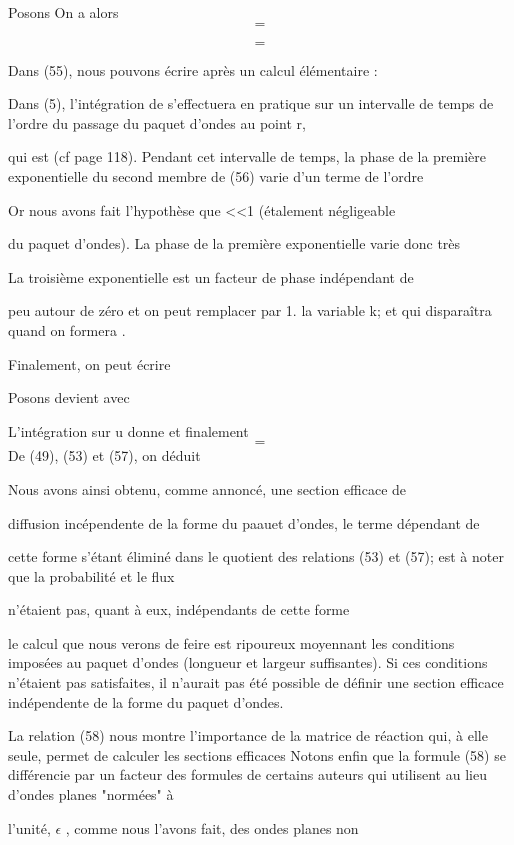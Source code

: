 Posons
On a alors
\[
\tag{55}=
\]

\[
\tag{56}=
\]


Dans (55), nous pouvons écrire après un calcul élémentaire :

Dans (5), l'intégration de  s'effectuera en pratique sur un
intervalle de temps de l'ordre du passage du paquet d'ondes au point r,

qui est (cf page 118).
Pendant cet intervalle de temps, la phase de la première exponentielle du
second membre de (56) varie d'un terme de l'ordre

Or nous avons fait l'hypothèse que <<1 (étalement négligeable

du paquet d'ondes). La phase de la première exponentielle varie donc très

La troisième exponentielle est un facteur de phase indépendant de

peu autour de zéro et on peut remplacer  par 1.
la variable k; et qui disparaîtra quand on formera .

Finalement, on peut écrire

Posons 
 devient  avec


L'intégration sur u donne 
et finalement
\[
\tag{57}=
\]
De (49), (53) et (57), on déduit

Nous avons ainsi obtenu, comme annoncé, une section efficace de

diffusion incépendente de la forme du paauet d'ondes, le terme dépendant de

cette forme  s'étant éliminé dans le quotient des relations
(53) et (57);  est à noter que la probabilité  et le flux

 n'étaient pas, quant à eux, indépendants de cette forme

le calcul que nous verons de feire est ripoureux moyennant les
conditions imposées au paquet d'ondes (longueur et largeur suffisantes).
Si ces conditions n'étaient pas satisfaites, il n'aurait pas été possible de
définir une section efficace indépendente de la forme du paquet d'ondes.

La relation (58) nous montre l'importance de la matrice  de
réaction qui, à elle seule, permet de calculer les sections efficaces
Notons enfin que la formule (58) se différencie par un facteur  des formules de
certains auteurs qui utilisent au lieu d'ondes planes "normées" à

l'unité,  $\epsilon$ , comme nous l'avons fait, des ondes planes non

